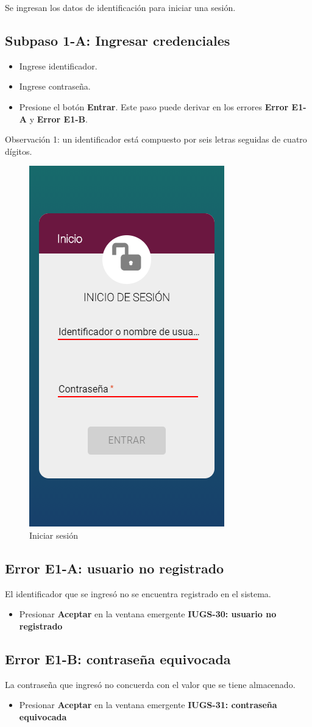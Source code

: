 Se ingresan los datos de identificación para iniciar una sesión.
\subsection{Subpaso 1-A: Ingresar credenciales}
\begin{itemize}
	\item Ingrese identificador.
	\item Ingrese contraseña.
	\item Presione el botón \textbf{Entrar}. Este paso puede derivar
		en los errores \textbf{Error E1-A} y \textbf{Error E1-B}.
\end{itemize}
Observación 1: un identificador está compuesto por seis letras seguidas
	de cuatro dígitos.
	
	\begin{figure}[hbtp]
		\centering
		\includegraphics[scale=0.3]{images/InterfazMovil/IUGS00_login.png}
		\caption{Iniciar sesión}
	\end{figure}
	

\subsection{Error E1-A: usuario no registrado}
El identificador que se ingresó no se encuentra registrado en el sistema.
\begin{itemize}
	\item Presionar \textbf{Aceptar} en la ventana emergente 
		\textbf{IUGS-30: usuario no registrado}
\end{itemize}

\subsection{Error E1-B: contraseña equivocada}
La contraseña que ingresó no concuerda con el valor que se tiene almacenado.
\begin{itemize}
	\item Presionar \textbf{Aceptar} en la ventana emergente 
		\textbf{IUGS-31: contraseña equivocada}
\end{itemize}
